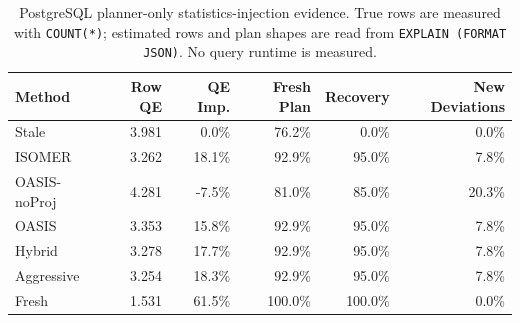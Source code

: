 \begin{table}[t]
  \centering
  \small
  \caption{PostgreSQL planner-only statistics-injection evidence. True rows are measured with \texttt{COUNT(*)}; estimated rows and plan shapes are read from \texttt{EXPLAIN (FORMAT JSON)}. No query runtime is measured.}
  \label{tab:postgres_planner_stats_injection}
  \setlength{\tabcolsep}{4pt}
  \begin{tabular}{lrrrrr}
    \toprule
    Method & Row QE & QE Imp. & Fresh Plan & Recovery & New Deviations \\
    \midrule
    Stale & 3.981 & 0.0\% & 76.2\% & 0.0\% & 0.0\% \\
    ISOMER & 3.262 & 18.1\% & 92.9\% & 95.0\% & 7.8\% \\
    OASIS-noProj & 4.281 & -7.5\% & 81.0\% & 85.0\% & 20.3\% \\
    OASIS & 3.353 & 15.8\% & 92.9\% & 95.0\% & 7.8\% \\
    Hybrid & 3.278 & 17.7\% & 92.9\% & 95.0\% & 7.8\% \\
    Aggressive & 3.254 & 18.3\% & 92.9\% & 95.0\% & 7.8\% \\
    Fresh & 1.531 & 61.5\% & 100.0\% & 100.0\% & 0.0\% \\
    \bottomrule
  \end{tabular}
\end{table}
